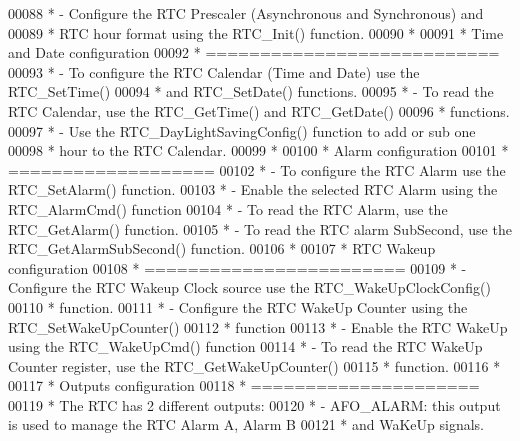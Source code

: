 \begin{DoxyCode}
00088 \textcolor{comment}{  *            - Configure the RTC Prescaler (Asynchronous and Synchronous) and}
00089 \textcolor{comment}{  *              RTC hour format using the RTC\_Init() function.}
00090 \textcolor{comment}{  *}
00091 \textcolor{comment}{  *          Time and Date configuration}
00092 \textcolor{comment}{  *          ===========================}
00093 \textcolor{comment}{  *            - To configure the RTC Calendar (Time and Date) use the RTC\_SetTime()}
00094 \textcolor{comment}{  *              and RTC\_SetDate() functions.}
00095 \textcolor{comment}{  *            - To read the RTC Calendar, use the RTC\_GetTime() and RTC\_GetDate()}
00096 \textcolor{comment}{  *              functions.}
00097 \textcolor{comment}{  *            - Use the RTC\_DayLightSavingConfig() function to add or sub one}
00098 \textcolor{comment}{  *              hour to the RTC Calendar.    }
00099 \textcolor{comment}{  *}
00100 \textcolor{comment}{  *          Alarm configuration}
00101 \textcolor{comment}{  *          ===================}
00102 \textcolor{comment}{  *            - To configure the RTC Alarm use the RTC\_SetAlarm() function.}
00103 \textcolor{comment}{  *            - Enable the selected RTC Alarm using the RTC\_AlarmCmd() function}
00104 \textcolor{comment}{  *            - To read the RTC Alarm, use the RTC\_GetAlarm() function.}
00105 \textcolor{comment}{  *            - To read the RTC alarm SubSecond, use the RTC\_GetAlarmSubSecond() function.}
00106 \textcolor{comment}{  *}
00107 \textcolor{comment}{  *          RTC Wakeup configuration}
00108 \textcolor{comment}{  *          ========================}
00109 \textcolor{comment}{  *            - Configure the RTC Wakeup Clock source use the RTC\_WakeUpClockConfig()}
00110 \textcolor{comment}{  *              function.}
00111 \textcolor{comment}{  *            - Configure the RTC WakeUp Counter using the RTC\_SetWakeUpCounter() }
00112 \textcolor{comment}{  *              function  }
00113 \textcolor{comment}{  *            - Enable the RTC WakeUp using the RTC\_WakeUpCmd() function  }
00114 \textcolor{comment}{  *            - To read the RTC WakeUp Counter register, use the RTC\_GetWakeUpCounter() }
00115 \textcolor{comment}{  *              function.}
00116 \textcolor{comment}{  *}
00117 \textcolor{comment}{  *          Outputs configuration}
00118 \textcolor{comment}{  *          =====================}
00119 \textcolor{comment}{  *          The RTC has 2 different outputs:}
00120 \textcolor{comment}{  *            - AFO\_ALARM: this output is used to manage the RTC Alarm A, Alarm B}
00121 \textcolor{comment}{  *              and WaKeUp signals.          }

\end{DoxyCode}
